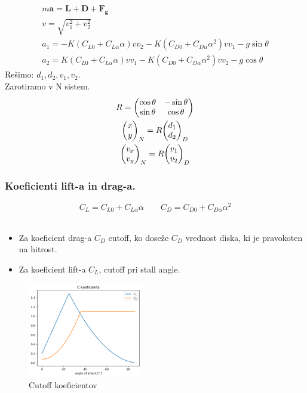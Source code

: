 \documentclass{beamer}
\begin{document}

\begin{frame}
\begin{gather}
m \bm a = \bm L + \bm D + \bm F_{\bm g}\\
v = \sqrt{v_1^2 + v_2^2}\\
a_1 = -K (C_{L0} + C_{L \alpha} \alpha) v v_2 - K (C_{D0} + C_{D \alpha} \alpha^2) v v_1 - g \sin \theta\\
a_2 = K (C_{L0} + C_{L \alpha} \alpha) v v_1 - K (C_{D0} + C_{D \alpha} \alpha^2) v v_2 - g \cos\theta
\end{gather}
Rešimo: \(d_1, d_2, v_1, v_2 \).\\
Zarotiramo v N sistem.
\begin{gather}
R = \mqty(\cos \theta & -\sin \theta \\ \sin \theta & \cos \theta)\\
\mqty(x \\ y)_N = R \mqty(d_1 \\ d_2)_D\\
\mqty(v_x \\ v_y)_N = R \mqty(v_1 \\ v_2)_D
\end{gather}
\end{frame}


\begin{frame}
\frametitle{Koeficienti lift-a in drag-a.}
\[C_L = C_{L0} + C_{L \alpha} \alpha \qquad C_D = C_{D0} + C_{D \alpha} \alpha^2\]\\
\begin{itemize}

\item Za koeficient drag-a $C_D$ cutoff, ko doseže $C_D$ vrednost diska, ki je pravokoten na hitrost.

\item Za koeficient lift-a $C_L$, cutoff pri stall angle.
\end{itemize}
\begin{figure}[H]
	\centering
	  \includegraphics[width=5cm]{koeficienta_cutoff.png}
	  \caption{Cutoff koeficientov}
\end{figure}
\end{frame}
\end{document}
